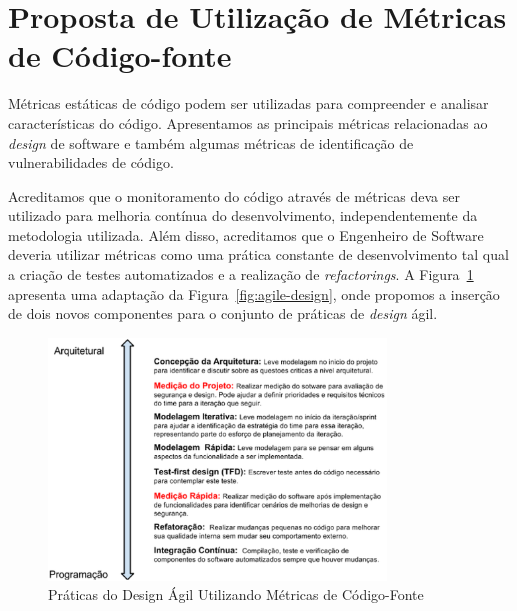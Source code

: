 %

%

\section{Proposta de Utilização de Métricas de Código-fonte}
\label{subsec-security-metrics}

Métricas estáticas de código podem ser utilizadas para compreender e analisar características do código. Apresentamos as principais métricas relacionadas ao \emph{design} de software e também algumas métricas de identificação de vulnerabilidades de código.

%

Acreditamos que o monitoramento do código através de métricas deva ser utilizado para melhoria contínua do desenvolvimento, independentemente da metodologia utilizada. Além disso, acreditamos que o Engenheiro de Software deveria utilizar métricas como uma prática constante de desenvolvimento tal qual a criação de testes automatizados e a realização de \emph{refactorings}. A Figura~\ref{fig:agile-design-metrics} apresenta uma adaptação da Figura~\ref{fig:agile-design}, onde propomos a inserção de dois novos componentes para o conjunto de práticas de \emph{design} ágil.

\graphicspath{{figuras/}}
\begin{figure}[h]
\centering
\includegraphics[width=0.8\textwidth]{DesignAgilComMedicao.eps}
\caption{Práticas do Design Ágil Utilizando Métricas de Código-Fonte}
\label{fig:agile-design-metrics}
\end{figure}

